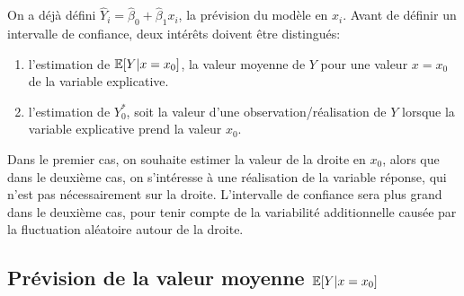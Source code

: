 On a déjà défini $\widehat{Y}_i = \widehat{\beta}_0 + \widehat{\beta}_1 x_i$, la prévision du modèle en $x_i$. Avant de définir un intervalle de confiance, deux intérêts doivent être distingués:
\begin{enumerate}
\item[(i)] l'estimation de $\mathbb{E}[Y|x=x_0]$, la valeur moyenne de $Y$ pour une valeur $x=x_0$
de la variable explicative.
\item[(ii)] l'estimation de ${Y}_0^*$, soit la valeur d'une observation/r\'ealisation de $Y$ lorsque la variable explicative prend la valeur $x_0$. 
\end{enumerate}
Dans le premier cas, on souhaite estimer la valeur de la droite en $x_0$, alors que dans le deuxième cas, on s'intéresse à une réalisation de la variable réponse, qui n'est pas nécessairement sur la droite. L'intervalle de confiance sera plus grand dans le deuxième cas, pour tenir compte de la variabilité additionnelle causée par la fluctuation aléatoire autour de la droite.

\subsection{Prévision de la valeur moyenne $\mathbb{E}[Y|x=x_0]$}

